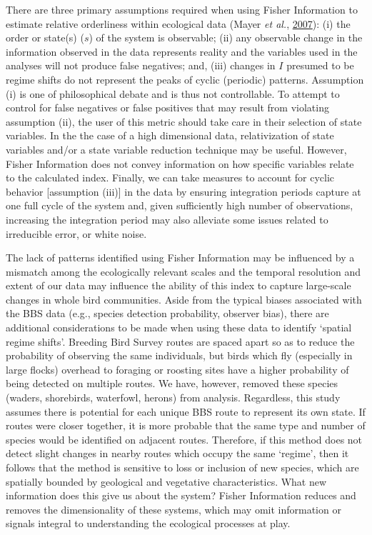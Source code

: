 \documentclass[12pt,twoside,openany]{reedthesis}
\begin{document}
There are three primary assumptions required when using Fisher Information to estimate relative orderliness within ecological data (Mayer \emph{et al.}, \protect\hyperlink{ref-mayer_applications_2007}{2007}): (i) the order or state(s) (\(s\)) of the system is observable; (ii) any observable change in the information observed in the data represents reality and the variables used in the analyses will not produce false negatives; and, (iii) changes in \(I\) presumed to be regime shifts do not represent the peaks of cyclic (periodic) patterns. Assumption (i) is one of philosophical debate and is thus not controllable. To attempt to control for false negatives or false positives that may result from violating assumption (ii), the user of this metric should take care in their selection of state variables. In the the case of a high dimensional data, relativization of state variables and/or a state variable reduction technique may be useful. However, Fisher Information does not convey information on how specific variables relate to the calculated index. Finally, we can take measures to account for cyclic behavior {[}assumption (iii){]} in the data by ensuring integration periods capture at one full cycle of the system and, given sufficiently high number of observations, increasing the integration period may also alleviate some issues related to irreducible error, or white noise.

The lack of patterns identified using Fisher Information may be influenced by a mismatch among the ecologically relevant scales and the temporal resolution and extent of our data may influence the ability of this index to capture large-scale changes in whole bird communities. Aside from the typical biases associated with the BBS data (e.g., species detection probability, observer bias), there are additional considerations to be made when using these data to identify `spatial regime shifts'. Breeding Bird Survey routes are spaced apart so as to reduce the probability of observing the same individuals, but birds which fly (especially in large flocks) overhead to foraging or roosting sites have a higher probability of being detected on multiple routes. We have, however, removed these species (waders, shorebirds, waterfowl, herons) from analysis. Regardless, this study assumes there is potential for each unique BBS route to represent its own state. If routes were closer together, it is more probable that the same type and number of species would be identified on adjacent routes. Therefore, if this method does not detect slight changes in nearby routes which occupy the same `regime', then it follows that the method is sensitive to loss or inclusion of new species, which are spatially bounded by geological and vegetative characteristics. What new information does this give us about the system? Fisher Information reduces and removes the dimensionality of these systems, which may omit information or signals integral to understanding the ecological processes at play.
\end{document}
